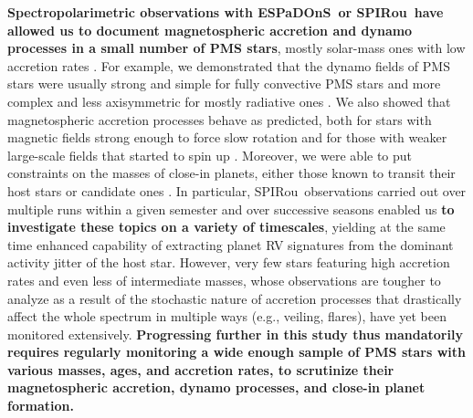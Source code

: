 \documentclass[
    traditabstract,
    longauth,
    onecolumn,
]{aa}
\def \spi{SPIRou}
\def \esp{ESPaDOnS}
\begin{document}
{\bf Spectropolarimetric observations with \esp\ or \spi\ have allowed us to document magnetospheric accretion and dynamo processes in a small number of PMS stars}, mostly solar-mass ones with low accretion rates \citep[e.g.,][]{Zaire2024}.  For example, we demonstrated that the dynamo fields of PMS stars were usually strong and simple for fully convective PMS stars and more complex and less axisymmetric for mostly radiative ones \citep[e.g.,][]{Donati2020a}.  We also showed that magnetospheric accretion processes behave as predicted, both for stars with magnetic fields strong enough to force slow rotation \citep{Donati2020b,Zaire2024} and for those with weaker large-scale fields that started to spin up \citep{Donati2024}.  Moreover, we were able to put constraints on the masses of close-in planets, either those known to transit their host stars \citep{Finociety2023,Donati2025} or candidate ones \citep[e.g.,][]{Zaire2024}.  In particular, \spi\ observations carried out over multiple runs within a given semester and over successive seasons enabled us {\bf to investigate these topics on a variety of timescales}, yielding at the same time enhanced capability of extracting planet RV signatures from the dominant activity jitter of the host star.  However, very few stars featuring high accretion rates \citep[e.g.,][]{Donati2026} and even less of intermediate masses, whose observations are tougher to analyze as a result of the stochastic nature of accretion processes that 
drastically affect the whole spectrum in multiple ways (e.g., veiling, flares), have yet been monitored extensively.  {\bf Progressing further in this study thus mandatorily requires regularly monitoring a wide enough sample of PMS stars with various masses, ages, and accretion rates, to scrutinize their magnetospheric accretion, dynamo processes, and close-in planet formation.}  
\end{document}
